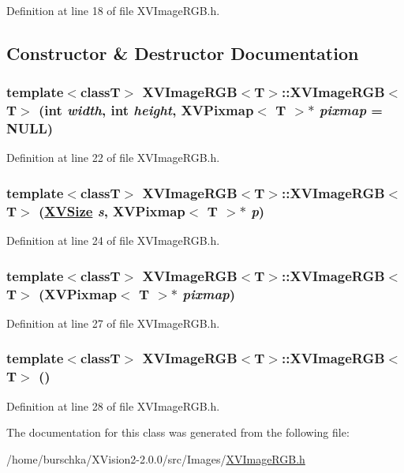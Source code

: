 Definition at line 18 of file XVImage\-RGB.h.

\subsection{Constructor \& Destructor Documentation}
\label{XVImageRGB_a0}
\hypertarget{class_XVImageRGB_a0}{
\subsubsection[XVImageRGB]{\setlength{\rightskip}{0pt plus 5cm}template$<$classT$>$ XVImage\-RGB$<$T$>$::XVImage\-RGB$<$T$>$ (int {\em width}, int {\em height}, XVPixmap$<$ T $>$$\ast$ {\em pixmap} = NULL)}}




Definition at line 22 of file XVImage\-RGB.h.\label{XVImageRGB_a1}
\hypertarget{class_XVImageRGB_a1}{
\subsubsection[XVImageRGB]{\setlength{\rightskip}{0pt plus 5cm}template$<$classT$>$ XVImage\-RGB$<$T$>$::XVImage\-RGB$<$T$>$ (\hyperlink{class_XVSize}{XVSize} {\em s}, XVPixmap$<$ T $>$$\ast$ {\em p})}}




Definition at line 24 of file XVImage\-RGB.h.\label{XVImageRGB_a2}
\hypertarget{class_XVImageRGB_a2}{
\subsubsection[XVImageRGB]{\setlength{\rightskip}{0pt plus 5cm}template$<$classT$>$ XVImage\-RGB$<$T$>$::XVImage\-RGB$<$T$>$ (XVPixmap$<$ T $>$$\ast$ {\em pixmap})}}




Definition at line 27 of file XVImage\-RGB.h.\label{XVImageRGB_a3}
\hypertarget{class_XVImageRGB_a3}{
\subsubsection[XVImageRGB]{\setlength{\rightskip}{0pt plus 5cm}template$<$classT$>$ XVImage\-RGB$<$T$>$::XVImage\-RGB$<$T$>$ ()}}




Definition at line 28 of file XVImage\-RGB.h.

The documentation for this class was generated from the following file:\begin{CompactItemize}
\item 
/home/burschka/XVision2-2.0.0/src/Images/\hyperlink{XVImageRGB.h-source}{XVImage\-RGB.h}\end{CompactItemize}
